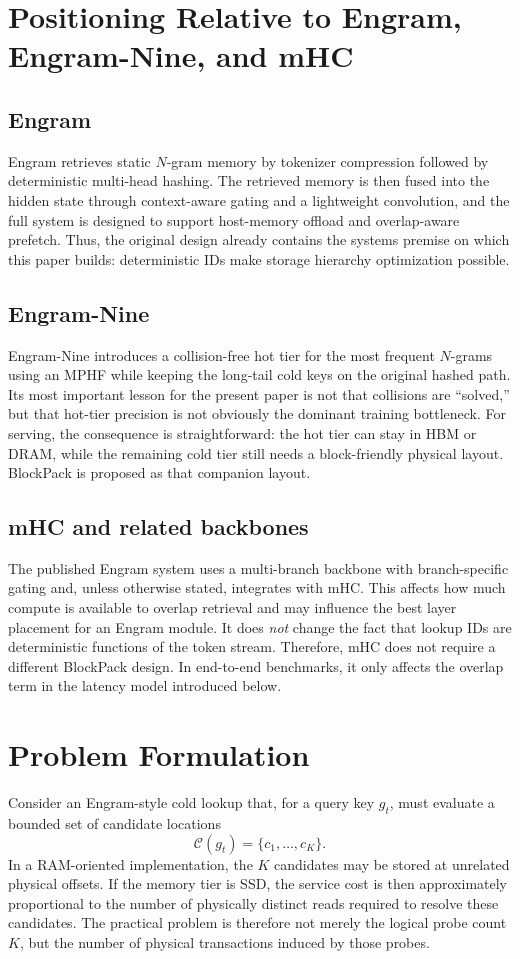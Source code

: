 \documentclass[11pt]{article}
\begin{document}
\section{Positioning Relative to Engram, Engram-Nine, and mHC}
\subsection{Engram}
Engram retrieves static $N$-gram memory by tokenizer compression followed by deterministic multi-head hashing. The retrieved memory is then fused into the hidden state through context-aware gating and a lightweight convolution, and the full system is designed to support host-memory offload and overlap-aware prefetch. Thus, the original design already contains the systems premise on which this paper builds: deterministic IDs make storage hierarchy optimization possible.

\subsection{Engram-Nine}
Engram-Nine introduces a collision-free hot tier for the most frequent $N$-grams using an MPHF while keeping the long-tail cold keys on the original hashed path. Its most important lesson for the present paper is not that collisions are ``solved,'' but that hot-tier precision is not obviously the dominant training bottleneck. For serving, the consequence is straightforward: the hot tier can stay in HBM or DRAM, while the remaining cold tier still needs a block-friendly physical layout. BlockPack is proposed as that companion layout.

\subsection{mHC and related backbones}
The published Engram system uses a multi-branch backbone with branch-specific gating and, unless otherwise stated, integrates with mHC. This affects how much compute is available to overlap retrieval and may influence the best layer placement for an Engram module. It does \emph{not} change the fact that lookup IDs are deterministic functions of the token stream. Therefore, mHC does not require a different BlockPack design. In end-to-end benchmarks, it only affects the overlap term in the latency model introduced below.

\section{Problem Formulation}
Consider an Engram-style cold lookup that, for a query key $g_t$, must evaluate a bounded set of candidate locations
\[
\mathcal{C}(g_t) = \{c_1, \ldots, c_K\}.
\]
In a RAM-oriented implementation, the $K$ candidates may be stored at unrelated physical offsets. If the memory tier is SSD, the service cost is then approximately proportional to the number of physically distinct reads required to resolve these candidates. The practical problem is therefore not merely the logical probe count $K$, but the number of physical transactions induced by those probes.
\end{document}
